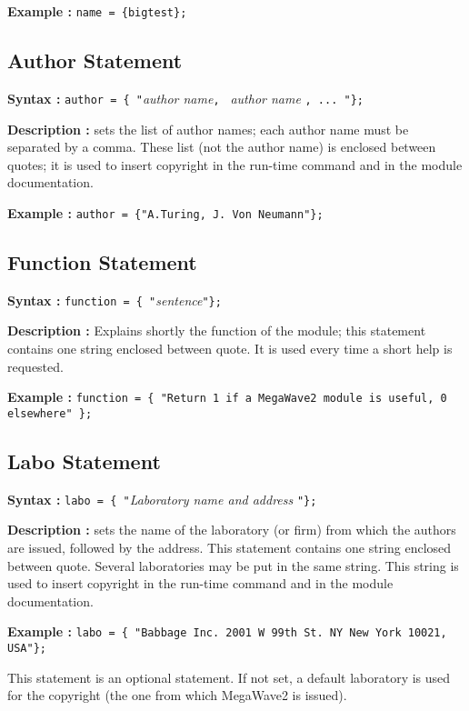 {\bf Example :} \verb+name = {bigtest};+

\subsection{Author Statement}

{\bf Syntax :} \verb+author = { "+{\em author name}\verb+, + {\em author 
name} \verb+, ... "};+

{\bf Description :} sets the list of author names; each author name 
must be separated by a comma.
These list (not the author name) is enclosed between quotes; it is
used to insert copyright in the run-time command and in the
module documentation.

{\bf Example :} \verb+author = {"A.Turing, J. Von Neumann"};+

\subsection{Function Statement}

{\bf Syntax :} \verb+function = { "+{\em sentence}\verb+"};+

{\bf Description :} Explains shortly the function of the module; 
this statement contains one string enclosed between quote.
It is used every time a short help is requested.

{\bf Example :} \verb+function = { "Return 1 if a MegaWave2 module is useful, 0 elsewhere" };+

\subsection{Labo Statement}

{\bf Syntax :} \verb+labo = { "+{\em Laboratory name and address }\verb+"};+

{\bf Description :} sets the name of the laboratory (or firm) from which the authors
are issued, followed by the address. 
This statement contains one string enclosed between quote.
Several laboratories may be put in the same string.
This string is used to insert copyright in the run-time command and in the
module documentation.

{\bf Example :} \verb+labo = { "Babbage Inc. 2001 W 99th St. NY New York 10021, USA"};+

This statement is an optional statement. 
If not set, a default laboratory is used for the copyright
(the one from which MegaWave2 is issued).

